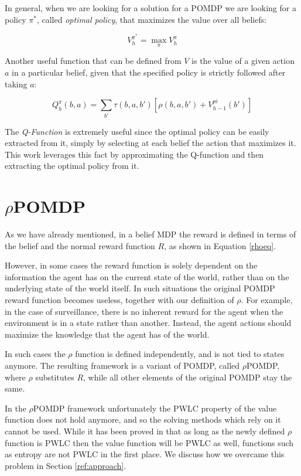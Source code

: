In general, when we are looking for a solution for a POMDP we are looking for a policy $\pi^*$, called
\textit{optimal policy}, that maximizes the value over all beliefs:

\begin{equation}
 V^{\pi^*}_h = \max_\pi V^{\pi}_h
\end{equation}

Another useful function that can be defined from $V$ is the value of a given action $a$ in a
particular belief, given that the specified policy is strictly followed after taking $a$:

\begin{equation}
 Q^{\pi}_h(b, a) = \sum_{b'} \tau(b,a,b') \left[ \rho(b,a,b') + V^{pi}_{h-1}(b') \right ]
\end{equation}

The \textit{Q-Function} is extremely useful since the optimal policy can be easily extracted from
it, simply by selecting at each belief the action that maximizes it. This work leverages this fact
by approximating the Q-function and then extracting the optimal policy from it.

\section{$\rho$POMDP}

As we have already mentioned, in a belief MDP the reward is defined in terms of the belief and the
normal reward function $R$, as shown in Equation \ref{rhoeq}.

However, in some cases the reward function is solely dependent on the information the agent has on
the current state of the world, rather than on the underlying state of the world itself. In such
situations the original POMDP reward function becomes useless, together with our definition of
$\rho$.  For example, in the case of surveillance, there is no inherent reward for the agent when
the environment is in a state rather than another. Instead, the agent actions should maximize the
knowledge that the agent has of the world.

In such cases the $\rho$ function is defined independently, and is not tied to states anymore. The
resulting framework is a variant of POMDP, called $\rho$POMDP, where $\rho$ substitutes $R$, while
all other elements of the original POMDP stay the same.

In the $\rho$POMDP framework unfortunately the PWLC property of the value function does not hold
anymore, and so the solving methods which rely on it cannot be used. While it has been proved in
\cite{cit:rpomdp} that as long as the newly defined $\rho$ function is PWLC then the value function
will be PWLC as well, functions such as entropy are not PWLC in the first place. We discuss how we
overcame this problem in Section \ref{ref:approach}.

